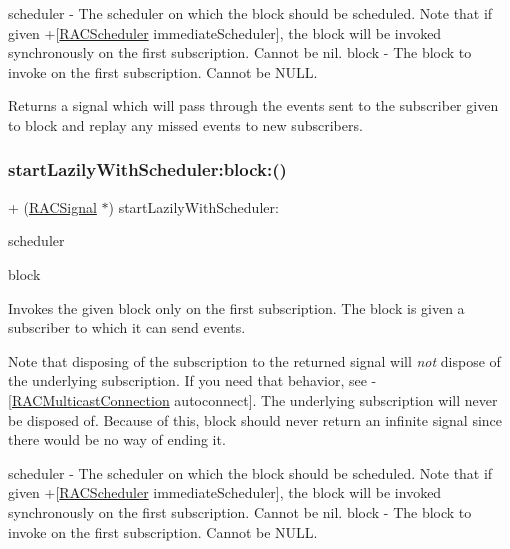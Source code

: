 scheduler -\/ The scheduler on which the block should be scheduled. Note that if given +\mbox{[}\mbox{\hyperlink{interface_r_a_c_scheduler}{R\+A\+C\+Scheduler}} immediate\+Scheduler\mbox{]}, the block will be invoked synchronously on the first subscription. Cannot be nil. block -\/ The block to invoke on the first subscription. Cannot be N\+U\+LL.

Returns a signal which will pass through the events sent to the subscriber given to {\ttfamily block} and replay any missed events to new subscribers. \mbox{\label{interface_r_a_c_signal_adbef9afea68ea6a2a81bb3115f47c22c}} 
\subsubsection{\texorpdfstring{start\+Lazily\+With\+Scheduler\+:block\+:()}{startLazilyWithScheduler:block:()}\hspace{0.1cm}{\footnotesize\ttfamily [2/3]}}
{\footnotesize\ttfamily + (\mbox{\hyperlink{interface_r_a_c_signal}{R\+A\+C\+Signal}} $\ast$) start\+Lazily\+With\+Scheduler\+: \begin{DoxyParamCaption}\item[{(\mbox{\hyperlink{interface_r_a_c_scheduler}{R\+A\+C\+Scheduler}} $\ast$)}]{scheduler }\item[{block:(void($^\wedge$)(id$<$ \mbox{\hyperlink{interface_r_a_c_subscriber}{R\+A\+C\+Subscriber}} $>$ subscriber))}]{block }\end{DoxyParamCaption}}

Invokes the given block only on the first subscription. The block is given a subscriber to which it can send events.

Note that disposing of the subscription to the returned signal will {\itshape not} dispose of the underlying subscription. If you need that behavior, see -\/\mbox{[}\mbox{\hyperlink{interface_r_a_c_multicast_connection}{R\+A\+C\+Multicast\+Connection}} autoconnect\mbox{]}. The underlying subscription will never be disposed of. Because of this, {\ttfamily block} should never return an infinite signal since there would be no way of ending it.

scheduler -\/ The scheduler on which the block should be scheduled. Note that if given +\mbox{[}\mbox{\hyperlink{interface_r_a_c_scheduler}{R\+A\+C\+Scheduler}} immediate\+Scheduler\mbox{]}, the block will be invoked synchronously on the first subscription. Cannot be nil. block -\/ The block to invoke on the first subscription. Cannot be N\+U\+LL.


